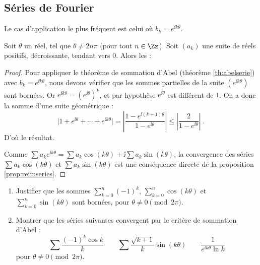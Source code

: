 \documentclass[class=report,crop=false]{standalone}
\begin{document}
\subsection{Séries de Fourier}

Le cas d'application le plus fréquent est celui où
$b_k=e^{\ii k\theta}$.

\begin{corollaire}
Soit $\theta$ un réel, tel que $\theta \neq 2n\pi$ (pour tout $n \in\Zz$). 
Soit $(a_k)$ une suite de réels positifs, décroissante,
tendant vers $0$. Alors les  :
\end{corollaire}




\begin{proof}
Pour appliquer le théorème de sommation d'Abel (théorème \ref{th:abelserie}) avec 
$b_k=e^{\ii k\theta}$, nous devons
vérifier que les sommes partielles de la suite $(e^{\ii k\theta})$ sont
bornées. Or $e^{\ii k\theta}=(e^{\ii \theta})^k$, et par hypothèse 
$e^{\ii \theta}$ est différent de $1$. On
a donc la somme d'une suite géométrique :
$$
\big|1+e^{\ii \theta}+\cdots+e^{\ii k\theta}\big| =
 \left|\frac{1-e^{\ii (k+1)\theta}}{1-e^{\ii \theta}}\right|\le
\left|\frac{2}{1-e^{\ii \theta}}\right|\;.$$
D'où le résultat. 

Comme $\sum a_k e^{\ii k\theta} = \sum a_k\cos(k\theta) + \ii \sum a_k\sin(k \theta)$,
la convergence des séries
$\sum a_k\cos(k\theta)$ et $\sum a_k\sin(k \theta)$ est une
conséquence directe de la proposition \ref{prop:reimseries}.
\end{proof}



\begin{miniexercices}
\begin{enumerate}
  \item Justifier que les sommes $\sum_{k=0}^n (-1)^k$, $\sum_{k=0}^n \cos(k\theta)$
  et $\sum_{k=0}^n \sin(k\theta)$ sont bornées, pour $\theta \neq 0 \pmod{2\pi}$.
 
  \item Montrer que les séries suivantes convergent par le critère de sommation d'Abel :
  $$\sum \frac{(-1)^k \cos k}{k} \qquad \sum \frac{\sqrt{k+1}}{k} \sin (k\theta)
  \qquad \frac{1}{e^{\ii k \theta}\ln k}$$
  pour $\theta \neq 0 \pmod{2\pi}$.
\end{enumerate}
\end{miniexercices}
\end{document}
